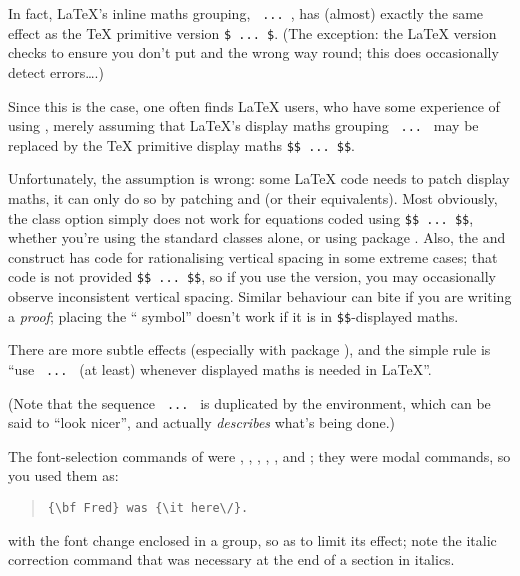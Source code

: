 In fact, \LaTeX{}'s inline maths grouping, %
\csx{(}\texttt{ ... }\csx{)}, has (almost) exactly the same effect as the
\TeX{} primitive version \texttt{\$ ... \$}.  (The exception:
the \LaTeX{} version checks to ensure you don't put \csx{(} and
\csx{)} the wrong way round; this does occasionally detect errors\dots{}.)

Since this is the case, one often finds \LaTeX{} users, who have some
experience of using \plaintex{}, merely assuming that \LaTeX{}'s
display maths grouping \csx{[}\texttt{ ... }\csx{]} may be replaced by
the \TeX{} primitive display maths \texttt{\$\$ ... \$\$}.

Unfortunately, the assumption is wrong: some \LaTeX{} code needs to
patch display maths, it can only do so by patching \csx{[} and \csx{]}
(or their equivalents).  Most obviously, the class option 
simply does not work for equations coded using %
\texttt{\$\$ ... \$\$}, whether you're using the standard classes
alone, or using package .  Also, the \csx{[} and
\csx{]} construct has code for rationalising vertical spacing in some
extreme cases; that code is not provided \texttt{\$\$ ... \$\$}, so if
you use the \plaintex{} version, you may occasionally observe
inconsistent vertical spacing.  Similar behaviour can bite if you are
writing a \emph{proof}; placing the `` symbol'' doesn't work
if it is in \texttt{\$\$}-displayed maths.

There are more subtle effects (especially with package
), and the simple rule is ``use %
\csx{[}\texttt{ ... }\csx{]} (at least) whenever displayed maths is
needed in \LaTeX{}''.

(Note that the sequence \csx{[}\texttt{ ... }\csx{]} is duplicated by
the  environment, which can be said to ``look
nicer'', and actually \emph{describes} what's being done.)


The font-selection commands of \LaTeXo{} were , ,
, , ,  and ; they were modal
commands, so you used them as:
\begin{quote}
\begin{verbatim}
{\bf Fred} was {\it here\/}.
\end{verbatim}
\end{quote}
with the font change enclosed in a group, so as to limit its effect;
note the italic correction command \csx{/} that was necessary at the
end of a section in italics.

